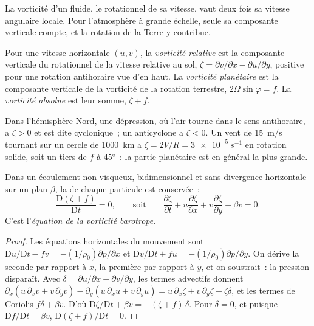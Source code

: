 La vorticité d'un fluide, le rotationnel de sa vitesse, vaut deux fois sa
vitesse angulaire locale. Pour l'atmosphère à grande échelle, seule sa composante
verticale compte, et la rotation de la Terre y contribue.

\begin{definition}\label{def:b3:atmospheric-dynamics:vorticity-kinds}
Pour une vitesse horizontale $(u, v)$, la \emph{vorticité
relative} est la composante verticale du rotationnel
de la vitesse relative au sol, $\zeta = \partial v/\partial x -
\partial u/\partial y$, positive pour une rotation antihoraire vue d'en haut.
La \emph{vorticité planétaire} est la composante verticale
de la vorticité de la rotation terrestre, $2\Omega\sin\varphi =
f$. La \emph{vorticité absolue} est leur somme,
$\zeta + f$.
\end{definition}

Dans l'hémisphère Nord, une dépression, où l'air tourne dans le sens antihoraire,
a $\zeta > 0$ et est dite cyclonique~; un anticyclone a $\zeta < 0$. Un
vent de \qty{15}{m/s} tournant sur un cercle de \qty{1000}{km} a $\zeta =
2V/R = \qty{3e-5}{s^{-1}}$ en rotation solide, soit un tiers de $f$ à \ang{45}~:
la partie planétaire est en général la plus grande.

\begin{theorem}\label{thm:b3:atmospheric-dynamics:bve}
Dans un écoulement non visqueux, bidimensionnel et sans divergence horizontale sur un
plan $\beta$, la  de chaque particule est conservée~:
\[
\frac{\mathrm D(\zeta + f)}{\mathrm Dt} = 0 ,
\qquad\text{soit}\qquad
\frac{\partial\zeta}{\partial t} + u\frac{\partial\zeta}{\partial x} + v\frac{\partial\zeta}{\partial y} + \beta v = 0 .
\]
C'est l'\emph{équation de la vorticité barotrope}.
\end{theorem}

\begin{proof}
Les équations horizontales du mouvement sont $\mathrm Du/\mathrm Dt - fv =
-(1/\rho_0)\partial p/\partial x$ et $\mathrm Dv/\mathrm Dt + fu =
-(1/\rho_0)\partial p/\partial y$. On dérive la seconde par rapport à
$x$, la première par rapport à $y$, et on soustrait~: la pression disparaît.
Avec $\delta = \partial u/\partial x + \partial v/\partial y$, les termes
advectifs donnent $\partial_x(u\,\partial_xv + v\,\partial_yv) -
\partial_y(u\,\partial_xu + v\,\partial_yu) = u\,\partial_x\zeta +
v\,\partial_y\zeta + \zeta\delta$, et les termes de Coriolis $f\delta + \beta
v$. D'où $\mathrm D\zeta/\mathrm Dt + \beta v = -(\zeta + f)\,\delta$. Pour
$\delta = 0$, et puisque $\mathrm Df/\mathrm Dt = \beta v$, $\mathrm D(\zeta +
f)/\mathrm Dt = 0$.
\end{proof}

